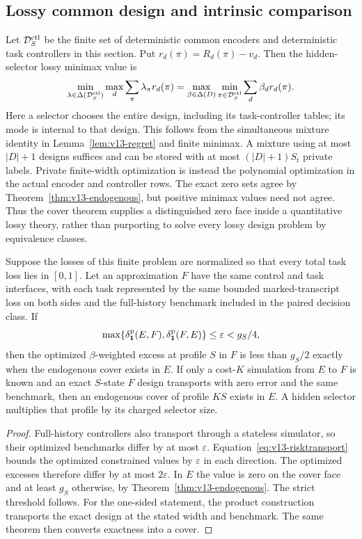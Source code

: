 \subsection{Lossy common design and intrinsic comparison}
Let $\mathcal D_S^{\rm ctl}$ be the finite set of deterministic common
encoders and deterministic task controllers in this section. Put
$r_d(\pi)=R_d(\pi)-v_d$. Then the hidden-selector lossy minimax value is
\begin{equation}\label{eq:v13-lossy}
 \min_{\lambda\in\Delta(\mathcal D_S^{\rm ctl})}
          \max_d\sum_\pi\lambda_\pi r_d(\pi)
 =\max_{\beta\in\Delta(D)}\min_{\pi\in\mathcal D_S^{\rm ctl}}
          \sum_d\beta_dr_d(\pi).
\end{equation}
Here a selector chooses the entire design, including its task-controller
tables; its mode is internal to that design. This follows from the
simultaneous mixture identity in Lemma~\ref{lem:v13-regret} and finite
minimax. A mixture using at most
$|D|+1$ designs suffices and can be stored with at most $(|D|+1)S_t$
private labels. Private finite-width optimization is instead the
polynomial optimization in the actual encoder and controller rows.
The exact zero sets agree by Theorem~\ref{thm:v13-endogenous}, but
positive minimax values need not agree. Thus the cover theorem supplies
a distinguished zero face inside a quantitative lossy theory, rather
than purporting to solve every lossy design problem by equivalence
classes.

\begin{corollary}
\label{cor:v13-certificate}
Suppose the losses of this finite problem are normalized so that every
total task loss lies in $[0,1]$. Let an approximation $F$ have the same
control and task interfaces, with each task represented by the same
bounded marked-transcript loss on both sides and the full-history
benchmark included in the paired decision class. If
\[
 \max\{\delta^{\rm p}_{\mathbf1}(E,F),\delta^{\rm p}_{\mathbf1}(F,E)\}
                    \le\varepsilon<g_S/4,
\]
then the optimized $\beta$-weighted excess at profile $S$ in $F$ is
less than $g_S/2$ exactly when the endogenous cover exists in $E$.
If only a cost-$K$ simulation from $E$ to $F$ is known and an exact
$S$-state $F$ design transports with zero error and the same benchmark,
then an endogenous cover of profile $KS$ exists in $E$. A hidden
selector multiplies that profile by its charged selector size.
\end{corollary}
\begin{proof}
Full-history controllers also transport through a stateless simulator,
so their optimized benchmarks differ by at most $\varepsilon$.
Equation~\eqref{eq:v13-risktransport} bounds the optimized constrained
values by $\varepsilon$ in each direction. The optimized excesses
therefore differ by at most $2\varepsilon$. In $E$ the value is zero
on the cover face and at least $g_S$ otherwise, by
Theorem~\ref{thm:v13-endogenous}. The strict threshold follows. For the
one-sided statement, the product construction transports the exact
design at the stated width and benchmark. The same theorem then
converts exactness into a cover.
\end{proof}

